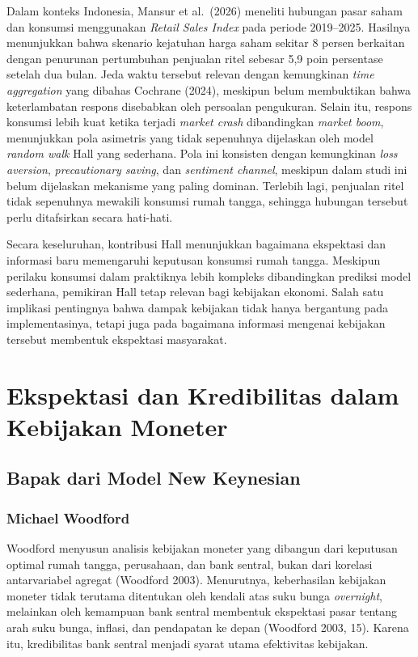 \documentclass[
  manuscript=article,
  layout=brief,
  year=2026,
  volume=1,
]{den}
\begin{document}
Dalam konteks Indonesia, Mansur et al.~(2026) meneliti hubungan pasar
saham dan konsumsi menggunakan \emph{Retail Sales Index} pada periode
2019--2025. Hasilnya menunjukkan bahwa skenario kejatuhan harga saham
sekitar 8 persen berkaitan dengan penurunan pertumbuhan penjualan ritel
sebesar 5,9 poin persentase setelah dua bulan. Jeda waktu tersebut
relevan dengan kemungkinan \emph{time aggregation} yang dibahas Cochrane
(2024), meskipun belum membuktikan bahwa keterlambatan respons
disebabkan oleh persoalan pengukuran. Selain itu, respons konsumsi lebih
kuat ketika terjadi \emph{market crash} dibandingkan \emph{market boom},
menunjukkan pola asimetris yang tidak sepenuhnya dijelaskan oleh model
\emph{random walk} Hall yang sederhana. Pola ini konsisten dengan
kemungkinan \emph{loss aversion}, \emph{precautionary saving}, dan
\emph{sentiment channel}, meskipun dalam studi ini belum dijelaskan
mekanisme yang paling dominan. Terlebih lagi, penjualan ritel tidak
sepenuhnya mewakili konsumsi rumah tangga, sehingga hubungan tersebut
perlu ditafsirkan secara hati-hati.

Secara keseluruhan, kontribusi Hall menunjukkan bagaimana ekspektasi dan
informasi baru memengaruhi keputusan konsumsi rumah tangga. Meskipun
perilaku konsumsi dalam praktiknya lebih kompleks dibandingkan prediksi
model sederhana, pemikiran Hall tetap relevan bagi kebijakan ekonomi.
Salah satu implikasi pentingnya bahwa dampak kebijakan tidak hanya
bergantung pada implementasinya, tetapi juga pada bagaimana informasi
mengenai kebijakan tersebut membentuk ekspektasi masyarakat.

\section{Ekspektasi dan Kredibilitas dalam Kebijakan
Moneter}\label{ekspektasi-dan-kredibilitas-dalam-kebijakan-moneter-1}

\subsection{Bapak dari Model New
Keynesian}\label{bapak-dari-model-new-keynesian}

\subsubsection{Michael Woodford}\label{michael-woodford}

Woodford menyusun analisis kebijakan moneter yang dibangun dari
keputusan optimal rumah tangga, perusahaan, dan bank sentral, bukan dari
korelasi antarvariabel agregat (Woodford 2003). Menurutnya, keberhasilan
kebijakan moneter tidak terutama ditentukan oleh kendali atas suku bunga
\emph{overnight}, melainkan oleh kemampuan bank sentral membentuk
ekspektasi pasar tentang arah suku bunga, inflasi, dan pendapatan ke
depan (Woodford 2003, 15). Karena itu, kredibilitas bank sentral menjadi
syarat utama efektivitas kebijakan.
\end{document}
